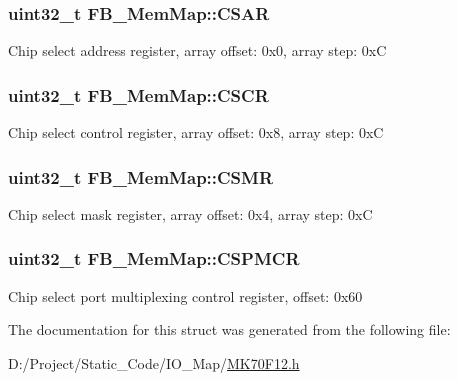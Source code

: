 \subsubsection[{C\+S\+A\+R}]{\setlength{\rightskip}{0pt plus 5cm}uint32\+\_\+t F\+B\+\_\+\+Mem\+Map\+::\+C\+S\+A\+R}\label{struct_f_b___mem_map_aa59ea1aff2f195dc7d41ef8611884381}
Chip select address register, array offset\+: 0x0, array step\+: 0x\+C \hypertarget{struct_f_b___mem_map_a7a1e48a5fde6382a076243009f5c0846}{}
\subsubsection[{C\+S\+C\+R}]{\setlength{\rightskip}{0pt plus 5cm}uint32\+\_\+t F\+B\+\_\+\+Mem\+Map\+::\+C\+S\+C\+R}\label{struct_f_b___mem_map_a7a1e48a5fde6382a076243009f5c0846}
Chip select control register, array offset\+: 0x8, array step\+: 0x\+C \hypertarget{struct_f_b___mem_map_a02c1e1542339e83d168a52e763f60228}{}
\subsubsection[{C\+S\+M\+R}]{\setlength{\rightskip}{0pt plus 5cm}uint32\+\_\+t F\+B\+\_\+\+Mem\+Map\+::\+C\+S\+M\+R}\label{struct_f_b___mem_map_a02c1e1542339e83d168a52e763f60228}
Chip select mask register, array offset\+: 0x4, array step\+: 0x\+C \hypertarget{struct_f_b___mem_map_a7876f1f5e2d0718968b09242af73b600}{}
\subsubsection[{C\+S\+P\+M\+C\+R}]{\setlength{\rightskip}{0pt plus 5cm}uint32\+\_\+t F\+B\+\_\+\+Mem\+Map\+::\+C\+S\+P\+M\+C\+R}\label{struct_f_b___mem_map_a7876f1f5e2d0718968b09242af73b600}
Chip select port multiplexing control register, offset\+: 0x60 

The documentation for this struct was generated from the following file\+:\begin{DoxyCompactItemize}
\item 
D\+:/\+Project/\+Static\+\_\+\+Code/\+I\+O\+\_\+\+Map/\hyperlink{_m_k70_f12_8h}{M\+K70\+F12.\+h}\end{DoxyCompactItemize}
